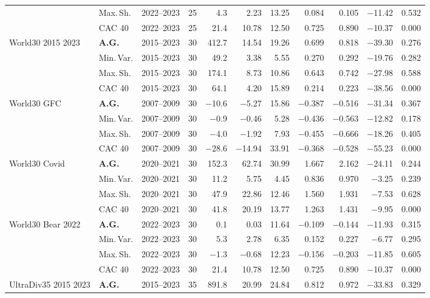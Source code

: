 \begin{longtable}{p{2.6cm} l c c r r r r r r r}
 & Max.\,Sh. & 2022--2023 & 25 & 4.3 & 2.23 & 13.25 & 0.084 & 0.105 & $-$11.42 & 0.532 \\
 & CAC 40 & 2022--2023 & 25 & 21.4 & 10.78 & 12.50 & 0.725 & 0.890 & $-$10.37 & 0.000 \\
\midrule
World30 2015 2023 & \textbf{A.G.} & 2015--2023 & 30 & 412.7 & 14.54 & 19.26 & 0.699 & 0.818 & $-$39.30 & 0.276 \\
 & Min.\,Var. & 2015--2023 & 30 & 49.2 & 3.38 & 5.55 & 0.270 & 0.292 & $-$19.76 & 0.282 \\
 & Max.\,Sh. & 2015--2023 & 30 & 174.1 & 8.73 & 10.86 & 0.643 & 0.742 & $-$27.98 & 0.588 \\
 & CAC 40 & 2015--2023 & 30 & 64.1 & 4.20 & 15.89 & 0.214 & 0.223 & $-$38.56 & 0.000 \\
\midrule
World30 GFC & \textbf{A.G.} & 2007--2009 & 30 & $-$10.6 & $-$5.27 & 15.86 & $-$0.387 & $-$0.516 & $-$31.34 & 0.367 \\
 & Min.\,Var. & 2007--2009 & 30 & $-$0.9 & $-$0.46 & 5.28 & $-$0.436 & $-$0.563 & $-$12.82 & 0.178 \\
 & Max.\,Sh. & 2007--2009 & 30 & $-$4.0 & $-$1.92 & 7.93 & $-$0.455 & $-$0.666 & $-$18.26 & 0.405 \\
 & CAC 40 & 2007--2009 & 30 & $-$28.6 & $-$14.94 & 33.91 & $-$0.368 & $-$0.528 & $-$55.23 & 0.000 \\
\midrule
World30 Covid & \textbf{A.G.} & 2020--2021 & 30 & 152.3 & 62.74 & 30.99 & 1.667 & 2.162 & $-$24.11 & 0.244 \\
 & Min.\,Var. & 2020--2021 & 30 & 11.2 & 5.75 & 4.45 & 0.836 & 0.970 & $-$3.25 & 0.239 \\
 & Max.\,Sh. & 2020--2021 & 30 & 47.9 & 22.86 & 12.46 & 1.560 & 1.931 & $-$7.53 & 0.628 \\
 & CAC 40 & 2020--2021 & 30 & 41.8 & 20.19 & 13.77 & 1.263 & 1.431 & $-$9.95 & 0.000 \\
\midrule
World30 Bear 2022 & \textbf{A.G.} & 2022--2023 & 30 & 0.1 & 0.03 & 11.64 & $-$0.109 & $-$0.144 & $-$11.93 & 0.315 \\
 & Min.\,Var. & 2022--2023 & 30 & 5.3 & 2.78 & 6.35 & 0.152 & 0.227 & $-$6.77 & 0.295 \\
 & Max.\,Sh. & 2022--2023 & 30 & $-$1.3 & $-$0.68 & 12.23 & $-$0.156 & $-$0.203 & $-$11.85 & 0.605 \\
 & CAC 40 & 2022--2023 & 30 & 21.4 & 10.78 & 12.50 & 0.725 & 0.890 & $-$10.37 & 0.000 \\
\midrule
UltraDiv35 2015 2023 & \textbf{A.G.} & 2015--2023 & 35 & 891.8 & 20.99 & 24.84 & 0.812 & 0.972 & $-$33.83 & 0.329 \\

\end{longtable}
